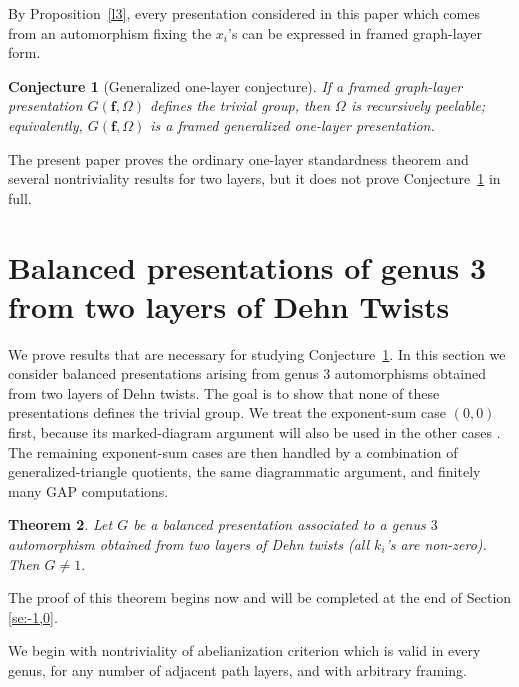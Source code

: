 \documentclass{article}
\newtheorem{theorem}{Theorem}[section]
\newtheorem{conjecture}[theorem]{Conjecture}
\begin{document}
By Proposition~\ref{l3}, every presentation considered in this paper which
comes from an automorphism fixing the $x_i$'s can be expressed in framed
graph-layer form.

\begin{conjecture}[Generalized one-layer conjecture]
\label{conj:generalized-one-layer}
If a framed graph-layer presentation $G(\mathbf f,\Omega)$ defines the
trivial group, then $\Omega$ is recursively peelable; equivalently,
$G(\mathbf f,\Omega)$ is a framed generalized one-layer presentation.
\end{conjecture}

The present paper proves the ordinary one-layer standardness theorem and
several nontriviality results for two layers, but it does not prove
Conjecture~\ref{conj:generalized-one-layer} in full.

\section {Balanced presentations of genus 3 from two layers of Dehn Twists}\label{se:4}
\begingroup
\setlength{\abovedisplayskip}{4pt plus 2pt minus 1pt}
\setlength{\belowdisplayskip}{4pt plus 2pt minus 1pt}
\setlength{\abovedisplayshortskip}{2pt plus 1pt}
\setlength{\belowdisplayshortskip}{2pt plus 1pt minus 1pt}
\setlength{\jot}{2pt}
We prove results that are necessary for studying
Conjecture~\ref{conj:generalized-one-layer}.  In this section we consider
balanced presentations arising from genus \(3\) automorphisms obtained from
two layers of Dehn twists.  The goal is to show that none of these
presentations defines the trivial group.  We treat the exponent-sum case
$(0,0)$ first, because its marked-diagram argument will also be used in the other
cases .  The remaining exponent-sum cases are then handled by a
combination of generalized-triangle quotients, the same diagrammatic
argument, and finitely many GAP computations.  
\begin{theorem}\label{thm:genus3-two-layers}
Let \(G\) be a balanced presentation associated to a genus \(3\) automorphism
obtained from two layers of Dehn twists (all $k_i$'s are non-zero). Then
$G\neq 1.$ 
\end{theorem}

The proof of this theorem begins now and will be completed at the end of Section \ref{se:-1,0}.

We begin with nontriviality of abelianization criterion which is valid in every genus, for
any number of adjacent path layers, and with arbitrary framing.
\end{document}
